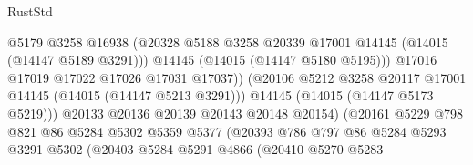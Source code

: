 \begin{lexlean}{RustStd}
\begin{coremodule}
                                          @5179
                                          @3258
                                          @16938
                                          (@20328
                                            @5188
                                            @3258
                                            @20339
                                            @17001
                                            @14145
                                            (@14015 (@14147 @5189 @3291)))
                                          @14145
                                          (@14015 (@14147 @5180 @5195)))
                                        @17016
                                        @17019
                                        @17022
                                        @17026
                                        @17031
                                        @17037))
                                    (@20106
                                      @5212
                                      @3258
                                      @20117
                                      @17001
                                      @14145
                                      (@14015 (@14147 @5213 @3291)))
                                    @14145
                                    (@14015 (@14147 @5173 @5219)))
                                  @20133
                                  @20136
                                  @20139
                                  @20143
                                  @20148
                                  @20154)
                                (@20161
                                  @5229
                                  @798
                                  @821
                                  @86
                                  @5284
                                  @5302
                                  @5359
                                  @5377
                                  (@20393
                                    @786
                                    @797
                                    @86
                                    @5284
                                    @5293
                                    @3291
                                    @5302
                                    (@20403
                                      @5284
                                      @5291
                                      @4866
                                      (@20410
                                        @5270
                                        @5283

\end{coremodule}
\end{lexlean}
